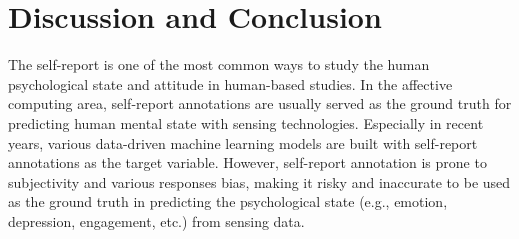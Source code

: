 \documentclass[sigconf]{acmart}
\begin{document}
\begin{comment}
Figure \ref{fig:impact_lent_anno} shows the impact of different class length on the perceived engagement measurement. It seems like students have higher multidimensional engagement on short classes based on their self-report responses. Then we show the impact of class length (i.e., long and short) on the physiologically measured engagement in Figure \ref{fig:impact_len}. We find that students have higher average heart rate, STD of heart rate and average EDA level in short classes while lower skin temperature than in long classes. The possible reasons may be two folds: (1) students physiological-measured engagement are not in line with their perceived engagement; (2) the average skin temperature may not be the good metrics for inferring the student engagement and more effective physiological metrics should be explored in the future.


\end{comment}









\section{Discussion and Conclusion}
\label{sec:conclusion}
The self-report is one of the most common ways to study the human psychological state and attitude in human-based studies. In the affective computing area, self-report annotations are usually served as the ground truth for predicting human mental state with sensing technologies. Especially in recent years, various data-driven machine learning models are built with self-report annotations as the target variable. However, self-report annotation is prone to  subjectivity and various responses bias, making it risky and inaccurate to be used as the ground truth in predicting the psychological state (e.g., emotion, depression, engagement, etc.) from sensing data.
\end{document}
